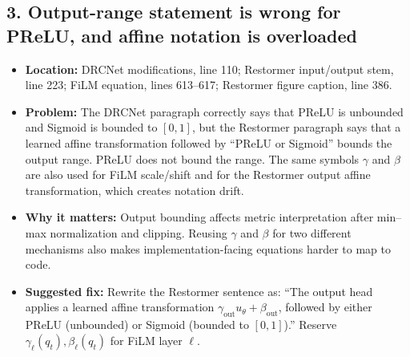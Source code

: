 \documentclass[11pt]{article}
\begin{document}
\subsection*{3. Output-range statement is wrong for PReLU, and affine notation is overloaded}
\begin{itemize}
  \item \textbf{Location:} DRCNet modifications, line 110; Restormer input/output stem, line 223; FiLM equation, lines 613--617; Restormer figure caption, line 386.
  \item \textbf{Problem:} The DRCNet paragraph correctly says that PReLU is unbounded and Sigmoid is bounded to $[0,1]$, but the Restormer paragraph says that a learned affine transformation followed by ``PReLU or Sigmoid'' bounds the output range. PReLU does not bound the range. The same symbols $\gamma$ and $\beta$ are also used for FiLM scale/shift and for the Restormer output affine transformation, which creates notation drift.
  \item \textbf{Why it matters:} Output bounding affects metric interpretation after min--max normalization and clipping. Reusing $\gamma$ and $\beta$ for two different mechanisms also makes implementation-facing equations harder to map to code.
  \item \textbf{Suggested fix:} Rewrite the Restormer sentence as: ``The output head applies a learned affine transformation $\gamma_{\mathrm{out}}u_\theta+\beta_{\mathrm{out}}$, followed by either PReLU (unbounded) or Sigmoid (bounded to $[0,1]$).'' Reserve $\gamma_{\ell}(q_t),\beta_{\ell}(q_t)$ for FiLM layer $\ell$.
\end{itemize}
\end{document}
